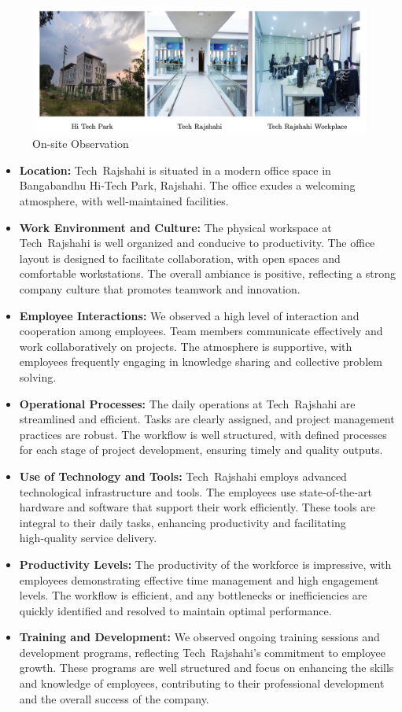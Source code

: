 \documentclass[12pt,a4paper]{article}
\begin{document}
\begin{figure}[H]
    \centering
    \includegraphics[width=\textwidth]{Fig/tech.png}
    \caption{On-site Observation}
    \label{fig:tech_contact}
\end{figure}

\begin{itemize}
    \item \textbf{Location:} Tech Rajshahi is situated in a modern office space in Bangabandhu Hi‑Tech Park, Rajshahi.  The office exudes a welcoming atmosphere, with well‑maintained facilities.
    \item \textbf{Work Environment and Culture:} The physical workspace at Tech Rajshahi is well organized and conducive to productivity.  The office layout is designed to facilitate collaboration, with open spaces and comfortable workstations.  The overall ambiance is positive, reflecting a strong company culture that promotes teamwork and innovation.
    \item \textbf{Employee Interactions:} We observed a high level of interaction and cooperation among employees.  Team members communicate effectively and work collaboratively on projects.  The atmosphere is supportive, with employees frequently engaging in knowledge sharing and collective problem solving.
    \item \textbf{Operational Processes:} The daily operations at Tech Rajshahi are streamlined and efficient.  Tasks are clearly assigned, and project management practices are robust.  The workflow is well structured, with defined processes for each stage of project development, ensuring timely and quality outputs.
    \item \textbf{Use of Technology and Tools:} Tech Rajshahi employs advanced technological infrastructure and tools.  The employees use state‑of‑the‑art hardware and software that support their work efficiently.  These tools are integral to their daily tasks, enhancing productivity and facilitating high‑quality service delivery.
    \item \textbf{Productivity Levels:} The productivity of the workforce is impressive, with employees demonstrating effective time management and high engagement levels.  The workflow is efficient, and any bottlenecks or inefficiencies are quickly identified and resolved to maintain optimal performance.
    \item \textbf{Training and Development:} We observed ongoing training sessions and development programs, reflecting Tech Rajshahi’s commitment to employee growth.  These programs are well structured and focus on enhancing the skills and knowledge of employees, contributing to their professional development and the overall success of the company.
\end{itemize}
\end{document}
